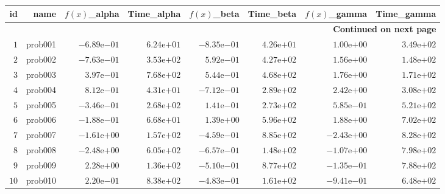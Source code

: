 \documentclass[varwidth=20cm,crop=true]{standalone}
\begin{document}
\begin{longtable}{rrrrrrrr}
\hline
id & name & \(f(x)\)\_alpha & Time\_alpha & \(f(x)\)\_beta & Time\_beta & \(f(x)\)\_gamma & Time\_gamma \\\hline
\endhead
\hline
\multicolumn{8}{r}{{\bfseries Continued on next page}}\\
\hline
\endfoot
\endlastfoot
\(     1\) & prob001 & \(-6.89\)e\(-01\) & \( 6.24\)e\(+01\) & \(-8.35\)e\(-01\) & \( 4.26\)e\(+01\) & \( 1.00\)e\(+00\) & \( 3.49\)e\(+02\) \\
\(     2\) & prob002 & \(-7.63\)e\(-01\) & \( 3.53\)e\(+02\) & \( 5.92\)e\(-01\) & \( 4.27\)e\(+02\) & \( 1.56\)e\(+00\) & \( 1.48\)e\(+02\) \\
\(     3\) & prob003 & \( 3.97\)e\(-01\) & \( 7.68\)e\(+02\) & \( 5.44\)e\(-01\) & \( 4.68\)e\(+02\) & \( 1.76\)e\(+00\) & \( 1.71\)e\(+02\) \\
\(     4\) & prob004 & \( 8.12\)e\(-01\) & \( 4.31\)e\(+01\) & \(-7.12\)e\(-01\) & \( 2.89\)e\(+02\) & \( 2.42\)e\(+00\) & \( 3.08\)e\(+02\) \\
\(     5\) & prob005 & \(-3.46\)e\(-01\) & \( 2.68\)e\(+02\) & \( 1.41\)e\(-01\) & \( 2.73\)e\(+02\) & \( 5.85\)e\(-01\) & \( 5.21\)e\(+02\) \\
\(     6\) & prob006 & \(-1.88\)e\(-01\) & \( 6.68\)e\(+01\) & \( 1.39\)e\(+00\) & \( 5.96\)e\(+02\) & \( 1.88\)e\(+00\) & \( 7.02\)e\(+02\) \\
\(     7\) & prob007 & \(-1.61\)e\(+00\) & \( 1.57\)e\(+02\) & \(-4.59\)e\(-01\) & \( 8.85\)e\(+02\) & \(-2.43\)e\(+00\) & \( 8.28\)e\(+02\) \\
\(     8\) & prob008 & \(-2.48\)e\(+00\) & \( 6.05\)e\(+02\) & \(-6.57\)e\(-01\) & \( 1.48\)e\(+02\) & \(-1.07\)e\(+00\) & \( 7.98\)e\(+02\) \\
\(     9\) & prob009 & \( 2.28\)e\(+00\) & \( 1.36\)e\(+02\) & \(-5.10\)e\(-01\) & \( 8.77\)e\(+02\) & \(-1.35\)e\(-01\) & \( 7.88\)e\(+02\) \\
\(    10\) & prob010 & \( 2.20\)e\(-01\) & \( 8.38\)e\(+02\) & \(-4.83\)e\(-01\) & \( 1.61\)e\(+02\) & \(-9.41\)e\(-01\) & \( 6.48\)e\(+02\) \\\hline
\end{longtable}
\end{document}

